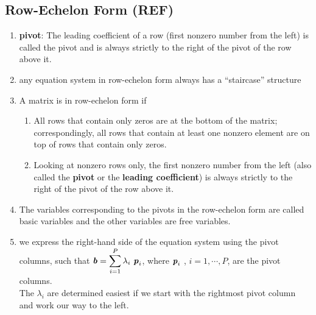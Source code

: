 \subsection{Row-Echelon Form (REF)}

\begin{enumerate}
    \item \textbf{pivot}: The leading coefficient of a row (first nonzero number from the left) is called the pivot and is always strictly to the right of the pivot of the row above it.
    \hfill \cite{mfml/book/mml/Deisenroth-Faisal-Ong}

    \item any equation system in row-echelon form always has a “staircase” structure
    \hfill \cite{mfml/book/mml/Deisenroth-Faisal-Ong}

    \item A matrix is in row-echelon form if
    \begin{enumerate}
        \item All rows that contain only zeros are at the bottom of the matrix; correspondingly, all rows that contain at least one nonzero element are on top of rows that contain only zeros.
        \hfill \cite{mfml/book/mml/Deisenroth-Faisal-Ong}

        \item Looking at nonzero rows only, the first nonzero number from the left (also called the \textbf{pivot} or the \textbf{leading coefficient}) is always strictly to the right of the pivot of the row above it.
        \hfill \cite{mfml/book/mml/Deisenroth-Faisal-Ong}
    \end{enumerate}

    \item The variables corresponding to the pivots in the row-echelon form are called basic variables and the other variables are free variables.
    \hfill \cite{mfml/book/mml/Deisenroth-Faisal-Ong}

    \item we express the right-hand side of the equation system using the pivot columns, such that $\text{\textbf{\textit{b}}} = \displaystyle\sum^P_{i=1} \lambda_i\ \text{\textbf{\textit{p}}}_i$, where $\text{\textbf{\textit{p}}}_i$ , $i = 1, \cdots , P$, are the pivot columns. 
    \\
    The $\lambda_i$ are determined easiest if we start with the rightmost pivot column and work our way to the left.
    \hfill \cite{mfml/book/mml/Deisenroth-Faisal-Ong}

    
\end{enumerate}



